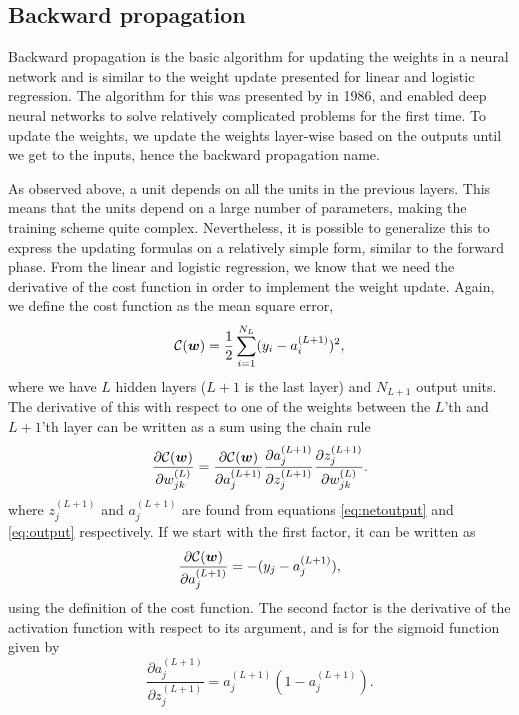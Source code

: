 \subsection{Backward propagation} \label{sec:backward}
Backward propagation is the basic algorithm for updating the weights in a neural network and is similar to the weight update presented for linear and logistic regression. The algorithm for this was presented by \citet{rumelhart_learning_1986} in 1986, and enabled deep neural networks to solve relatively complicated problems for the first time. To update the weights, we update the weights layer-wise based on the outputs until we get to the inputs, hence the backward propagation name. 

As observed above, a unit depends on all the units in the previous layers. This means that the units depend on a large number of parameters, making the training scheme quite complex. Nevertheless, it is possible to generalize this to express the updating formulas on a relatively simple form, similar to the forward phase. From the linear and logistic regression, we know that we need the derivative of the cost function in order to implement the weight update. Again, we define the cost function as the mean square error,
\begin{equation}
\mathcal{C}(\boldsymbol{{w}})=\frac{1}{2}\sum_{i=1}^{N_L}(y_i-a_i^{(L+1)})^2,
\end{equation}
where we have $L$ hidden layers ($L+1$ is the last layer) and $N_{L+1}$ output units. The derivative of this with respect to one of the weights between the $L$'th and $L+1$'th layer can be written as a sum using the chain rule
\begin{equation}
\frac{\partial\mathcal{C}(\boldsymbol{{w}})}{\partial w_{jk}^{(L)}}=\frac{\partial\mathcal{C}(\boldsymbol{{w}})}{\partial a_j^{(L+1)}}\frac{\partial a_j^{(L+1)}}{\partial z_j^{(L+1)}}\frac{\partial z_j^{(L+1)}}{\partial w_{jk}^{(L)}}.
\end{equation}
where $z_j^{(L+1)}$ and $a_j^{(L+1)}$ are found from equations \eqref{eq:netoutput} and \eqref{eq:output} respectively. If we start with the first factor, it can be written as
\begin{equation}
\frac{\partial\mathcal{C}(\boldsymbol{{w}})}{\partial a_j^{(L+1)}}=-(y_j-a_j^{(L+1)}),
\end{equation}
using the definition of the cost function. The second factor is the derivative of the activation function with respect to its argument, and is for the sigmoid function given by
\begin{equation}
\frac{\partial a_j^{(L+1)}}{\partial z_j^{(L+1)}}=a_j^{(L+1)}(1-a_j^{(L+1)}).
\end{equation}
